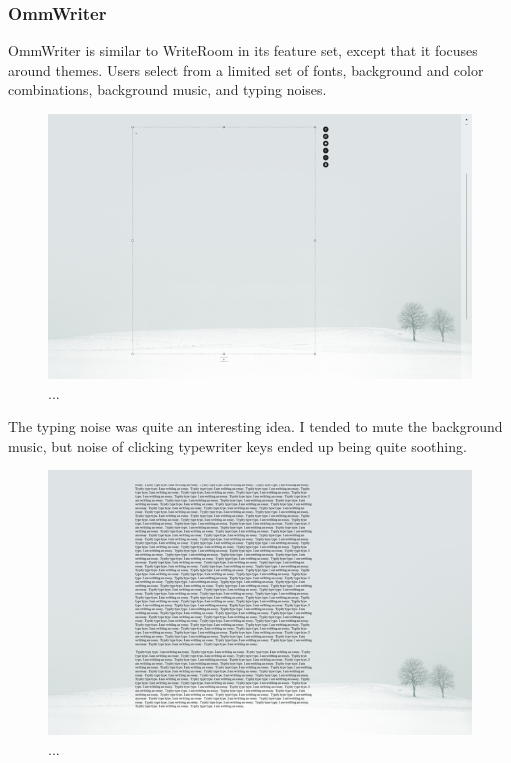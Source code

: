 \documentclass[10pt]{article}
\begin{document}
\subsubsection{OmmWriter}

OmmWriter \cite{ommwriter} is similar to WriteRoom in its feature set, except that it focuses around themes. Users select from a limited set of fonts, background and color combinations, background music, and typing noises.

\begin{figure}
   \centering
      \includegraphics[width=130mm]{images/ommwriter1.png}
   \caption{...}
\end{figure}

The typing noise was quite an interesting idea. I tended to mute the background music, but noise of clicking typewriter keys ended up being quite soothing.

\begin{figure}
   \centering
      \includegraphics[width=130mm]{images/ommwriter2.png}
   \caption{...}
\end{figure}
\end{document}
